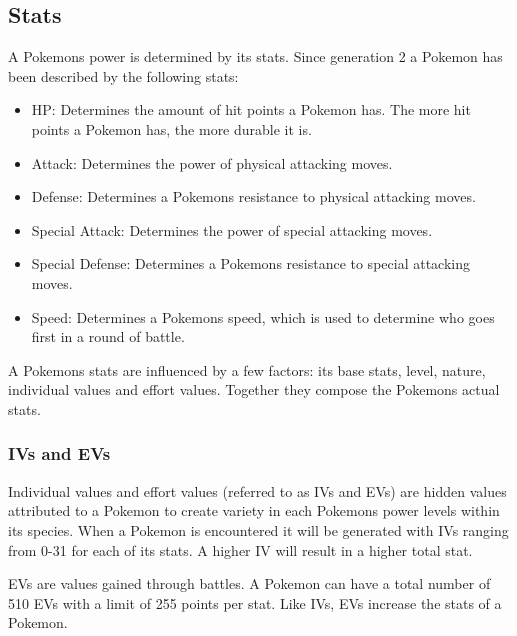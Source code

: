 \subsection{Stats}
A Pokemons power is determined by its stats. Since generation 2 a Pokemon has been described by the following stats:
\begin{itemize}
  \item HP: Determines the amount of hit points a Pokemon has. The more hit points a Pokemon has, the more durable it is.
  \item Attack: Determines the power of physical attacking moves.
  \item Defense: Determines a Pokemons resistance to physical attacking moves.
  \item Special Attack: Determines the power of special attacking moves.
  \item Special Defense: Determines a Pokemons resistance to special attacking moves.
  \item Speed: Determines a Pokemons speed, which is used to determine who goes first in a round of battle.
\end{itemize}
A Pokemons stats are influenced by a few factors: its base stats, level, nature, individual values and effort values.
Together they compose the Pokemons actual stats.

\subsubsection{IVs and EVs}
Individual values \cite{IndividualValues} and effort values \cite{EffortValues} (referred to as IVs and EVs) are hidden values attributed to a Pokemon to create variety in each Pokemons power levels within its species.
When a Pokemon is encountered it will be generated with IVs ranging from 0-31 for each of its stats. A higher IV will result in a higher total stat.

EVs are values gained through battles. A Pokemon can have a total number of 510 EVs with a limit of 255 points per stat. Like IVs, EVs increase
the stats of a Pokemon.

